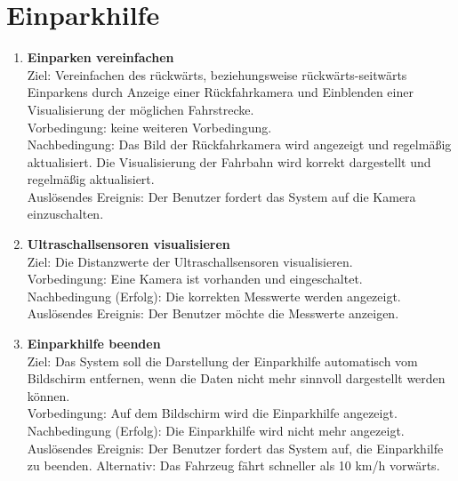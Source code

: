 \documentclass[pflichtenheft.tex]{subfiles}
\begin{document}
	\section{Einparkhilfe}
	
	\begin{enumerate}
	\setcounter{enumi}{\value{enumTemp}}

	\item{\textbf{Einparken vereinfachen}} \\ Ziel: Vereinfachen des rückwärts, beziehungsweise rückwärts-seitwärts Einparkens durch Anzeige einer Rückfahrkamera und Einblenden einer Visualisierung der möglichen Fahrstrecke. \\
	Vorbedingung: keine weiteren Vorbedingung. \\ Nachbedingung: Das Bild der Rückfahrkamera wird angezeigt und regelmäßig aktualisiert. Die Visualisierung der Fahrbahn wird korrekt dargestellt und regelmäßig aktualisiert.\\
	Auslösendes Ereignis: Der Benutzer fordert das System auf die Kamera einzuschalten. 

	\item{\textbf{Ultraschallsensoren visualisieren}} \label{ultrasound} \\ Ziel: Die Distanzwerte der Ultraschallsensoren visualisieren. \\ Vorbedingung: Eine Kamera ist vorhanden und eingeschaltet.\\
	Nachbedingung (Erfolg): Die korrekten Messwerte werden angezeigt.\\
	Auslösendes Ereignis: Der Benutzer möchte die Messwerte anzeigen.

	\item{\textbf{Einparkhilfe beenden}} \\ Ziel: Das System soll die Darstellung der Einparkhilfe automatisch vom Bildschirm entfernen, wenn die Daten nicht mehr sinnvoll dargestellt werden können. \\ Vorbedingung: Auf dem Bildschirm wird die Einparkhilfe angezeigt. \\ Nachbedingung (Erfolg): Die Einparkhilfe wird nicht mehr angezeigt.\\
	Auslösendes Ereignis: Der Benutzer fordert das System auf, die Einparkhilfe zu beenden. Alternativ: Das Fahrzeug fährt schneller als 10 km/h vorwärts.

	\setcounter{enumTemp}{\value{enumi}}

	\end{enumerate}
	
\end{document}
